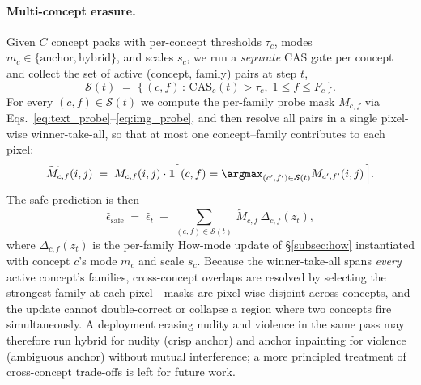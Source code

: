 \paragraph{Multi-concept erasure.}
Given $C$ concept packs with per-concept thresholds $\tau_c$, modes $m_c\!\in\!\{\text{anchor},\text{hybrid}\}$, and scales $s_c$, we run a \emph{separate} CAS gate per concept and collect the set of active (concept, family) pairs at step $t$,
\begin{equation*}
    \mathcal{S}(t) \;=\; \{\,(c,f)\,:\,\mathrm{CAS}_c(t) > \tau_c,\; 1 \le f \le F_c\,\}.
\end{equation*}
For every $(c,f) \in \mathcal{S}(t)$ we compute the per-family probe mask $M_{c,f}$ via Eqs.~\ref{eq:text_probe}--\ref{eq:img_probe}, and then resolve all pairs in a single pixel-wise winner-take-all, so that at most one concept--family contributes to each pixel:
\begin{equation}
    \widetilde{M}_{c,f}(i,j) \;=\; M_{c,f}(i,j)\cdot \mathbf{1}\!\Big[\,(c,f) = \argmax_{(c',f')\in\mathcal{S}(t)} M_{c',f'}(i,j)\,\Big].
    \label{eq:multi_wta}
\end{equation}
The safe prediction is then
\begin{equation}
    \hat{\epsilon}_{\text{safe}} \;=\; \hat{\epsilon}_t \;+\; \sum_{(c,f)\in\mathcal{S}(t)}\,\widetilde{M}_{c,f}\,\Delta_{c,f}(z_t),
    \label{eq:multi}
\end{equation}
where $\Delta_{c,f}(z_t)$ is the per-family How-mode update of \S\ref{subsec:how} instantiated with concept $c$'s mode $m_c$ and scale $s_c$. Because the winner-take-all spans \emph{every} active concept's families, cross-concept overlaps are resolved by selecting the strongest family at each pixel---masks are pixel-wise disjoint across concepts, and the update cannot double-correct or collapse a region where two concepts fire simultaneously. A deployment erasing nudity and violence in the same pass may therefore run hybrid for nudity (crisp anchor) and anchor inpainting for violence (ambiguous anchor) without mutual interference; a more principled treatment of cross-concept trade-offs is left for future work.

